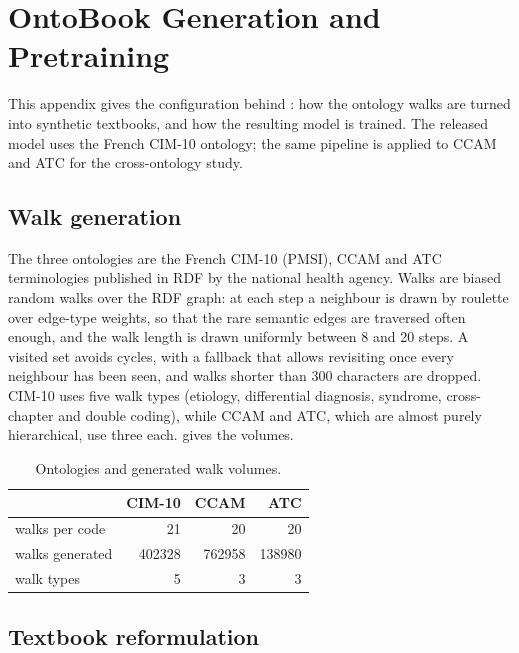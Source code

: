 \chapter{OntoBook Generation and Pretraining}
\label{app:ontobook-details}

This appendix gives the configuration behind : how the
ontology walks are turned into synthetic textbooks, and how the resulting model is
trained. The released model uses the French CIM-10 ontology; the same pipeline is
applied to CCAM and ATC for the cross-ontology study.

\section{Walk generation}

The three ontologies are the French CIM-10 (PMSI), CCAM and ATC terminologies
published in RDF by the national health agency. Walks are biased random walks over
the RDF graph: at each step a neighbour is drawn by roulette over edge-type weights,
so that the rare semantic edges are traversed often enough, and the walk length is
drawn uniformly between 8 and 20 steps. A visited set avoids cycles, with a fallback
that allows revisiting once every neighbour has been seen, and walks shorter than
300 characters are dropped. CIM-10 uses five walk types (etiology, differential
diagnosis, syndrome, cross-chapter and double coding), while CCAM and ATC, which are
almost purely hierarchical, use three each.  gives the volumes.

\begin{table}[t]
  \centering
  \small
  \setlength{\tabcolsep}{12pt}
  \begin{tabular}{@{}lrrr@{}}
    \toprule
    & CIM-10 & CCAM & ATC \\
    \midrule
    walks per code    & 21 & 20 & 20 \\
    walks generated   & 402328 & 762958 & 138980 \\
    walk types        & 5 & 3 & 3 \\
    \bottomrule
  \end{tabular}
\caption{Ontologies and generated walk volumes.}
\label{tab:ob-walks}
\end{table}

\section{Textbook reformulation}

